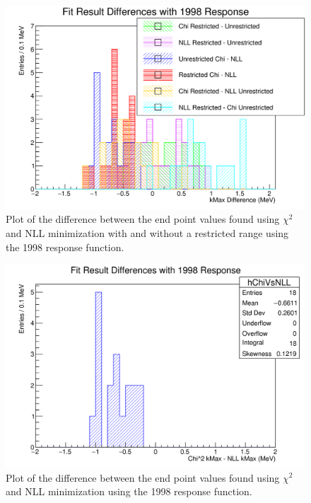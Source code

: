 \begin{figure}[h]
  \centering
  \includegraphics[width=\linewidth]{figures/png/compare_fit_results.png}
  \caption{Plot of the difference between the end point values found using $\chi^2$ and
    NLL minimization with and without a restricted range using the 1998 response function.}
  \label{fig:compareFits}
\end{figure}

\begin{figure}[h]
  \centering
  \includegraphics[width=\linewidth]{figures/png/compare_fit_results_unrestrictedOnly.png}
  \caption{Plot of the difference between the end point values found using $\chi^2$ and
    NLL minimization using the 1998 response function.}
  \label{fig:compareFits}
\end{figure}


